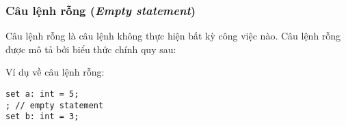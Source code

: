 \subsubsection{Câu lệnh rỗng (\textit{Empty statement})}

Câu lệnh rỗng là câu lệnh không thực hiện bất kỳ công việc nào. Câu lệnh rỗng được mô tả bởi biểu thức chính quy sau:

\regexemptystmt

\noindent Ví dụ về câu lệnh rỗng:
\begin{lstlisting}[]
set a: int = 5;
; // empty statement
set b: int = 3;
\end{lstlisting}
